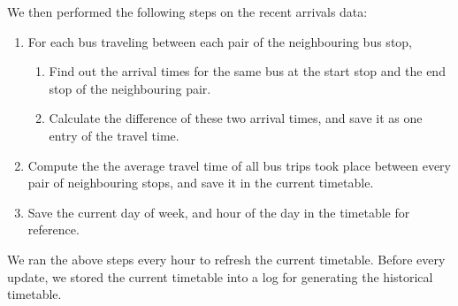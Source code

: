 \par We then performed the following steps on the recent arrivals data:

\begin{enumerate}
  \item For each bus traveling between each pair of the neighbouring bus stop,
  \begin{enumerate}
    \item Find out the arrival times for the same bus at the start stop and the end stop of the neighbouring pair.
    \item Calculate the difference of these two arrival times, and save it as one entry of the travel time.
  \end{enumerate}
  \item Compute the the average travel time of all bus trips took place between every pair of neighbouring stops, and save it in the current timetable.
  \item Save the current day of week, and hour of the day in the timetable for reference.
\end {enumerate}

\par We ran the above steps every hour to refresh the current timetable. Before every update, we stored the current timetable into a log for generating the historical timetable.





